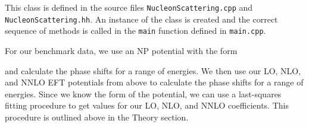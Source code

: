\documentclass[10pt,showpacs,preprintnumbers,footinbib,amsmath,amssymb,aps,prl,twocolumn,groupedaddress,superscriptaddress,showkeys]{revtex4-1}
\begin{document}
This class is defined in the source
files \texttt{NucleonScattering.cpp} and \texttt{NucleonScattering.hh}. An instance of the class is
created and the correct sequence of methods is called in the \texttt{main} function defined in
\texttt{main.cpp}.

For our benchmark data, we use an NP potential with the form



and calculate the phase shifts for a range of energies.
We then use our LO, NLO, and NNLO EFT potentials from above to calculate the phase shifts for 
a range of energies. Since we know the form of the potential, we can use a last-squares fitting procedure to get values for our LO, 
NLO, and NNLO coefficients. This procedure is outlined above in the Theory section.




\end{document}
